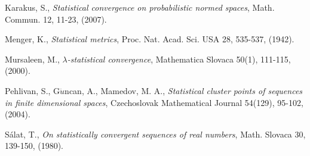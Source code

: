 \documentclass[reqno,b5paper]{amsart}
\theoremstyle{plain}
\theoremstyle{definition}
\begin{document}
\begin{thebibliography}{99}
 Karakus, S., \textit{Statistical convergence on probabilistic normed spaces}, Math. Commun. 12, 11-23, (2007).





 Menger, K., \textit{Statistical metrics}, Proc. Nat. Acad. Sci. USA 28, 535-537, (1942).

 Mursaleen, M., \textit{$\lambda$-statistical convergence}, Mathematica Slovaca 50(1), 111-115, (2000).






 Pehlivan, S., G$\ddot{u}$ncan, A., Mamedov, M. A., \textit{Statistical cluster points of sequences in finite dimensional spaces}, Czechoslovak
Mathematical Journal 54(129), 95-102, (2004).


 S\'alat, T., \textit{On statistically convergent sequences of real numbers}, Math. Slovaca 30, 139-150, (1980).


\end{thebibliography}
\end{document}
